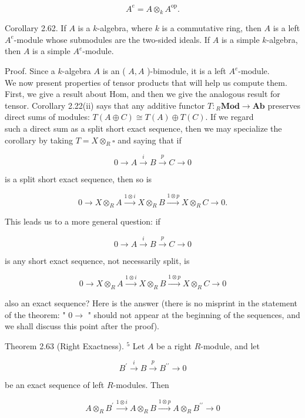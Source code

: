 \documentclass[10pt, letterpaper]{article}
\begin{document}
$$
A^{e}=A \otimes_{k} A^{\mathrm{op}} .
$$

Corollary 2.62. If $A$ is a $k$-algebra, where $k$ is a commutative ring, then $A$ is a left $A^{e}$-module whose submodules are the two-sided ideals. If $A$ is a simple $k$-algebra, then $A$ is a simple $A^{e}$-module.

Proof. Since a $k$-algebra $A$ is an ( $A, A$ )-bimodule, it is a left $A^{e}$-module.\\
We now present properties of tensor products that will help us compute them. First, we give a result about Hom, and then we give the analogous result for tensor. Corollary 2.22(ii) says that any additive functor $T:{ }_{R} \mathbf{M o d} \rightarrow \mathbf{A b}$ preserves direct sums of modules: $T(A \oplus C) \cong T(A) \oplus T(C)$. If we regard\\
such a direct sum as a split short exact sequence, then we may specialize the corollary by taking $T=X \otimes_{R} \square$ and saying that if

$$
0 \rightarrow A \xrightarrow{i} B \xrightarrow{p} C \rightarrow 0
$$

is a split short exact sequence, then so is

$$
0 \rightarrow X \otimes_{R} A \xrightarrow{1 \otimes i} X \otimes_{R} B \xrightarrow{1 \otimes p} X \otimes_{R} C \rightarrow 0 .
$$

This leads us to a more general question: if

$$
0 \rightarrow A \xrightarrow{i} B \xrightarrow{p} C \rightarrow 0
$$

is any short exact sequence, not necessarily split, is

$$
0 \rightarrow X \otimes_{R} A \xrightarrow{1 \otimes i} X \otimes_{R} B \xrightarrow{1 \otimes p} X \otimes_{R} C \rightarrow 0
$$

also an exact sequence? Here is the answer (there is no misprint in the statement of the theorem: " $0 \rightarrow$ " should not appear at the beginning of the sequences, and we shall discuss this point after the proof).

Theorem 2.63 (Right Exactness). ${ }^{5}$ Let $A$ be a right $R$-module, and let

$$
B^{\prime} \xrightarrow{i} B \xrightarrow{p} B^{\prime \prime} \rightarrow 0
$$

be an exact sequence of left $R$-modules. Then

$$
A \otimes_{R} B^{\prime} \xrightarrow{1 \otimes i} A \otimes_{R} B \xrightarrow{1 \otimes p} A \otimes_{R} B^{\prime \prime} \rightarrow 0
$$
\end{document}
